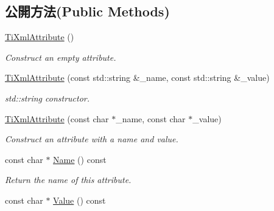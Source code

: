 \subsection*{公開方法(Public Methods)}
\begin{DoxyCompactItemize}
\item 
\hyperlink{class_ti_xml_attribute_a9cfa3c8179873fd485d83003b114f8e1}{Ti\+Xml\+Attribute} ()\hypertarget{class_ti_xml_attribute_a9cfa3c8179873fd485d83003b114f8e1}{}\label{class_ti_xml_attribute_a9cfa3c8179873fd485d83003b114f8e1}

\begin{DoxyCompactList}\small\item\em Construct an empty attribute. \end{DoxyCompactList}\item 
\hyperlink{class_ti_xml_attribute_a052213522caac3979960e0714063861d}{Ti\+Xml\+Attribute} (const std\+::string \&\+\_\+name, const std\+::string \&\+\_\+value)\hypertarget{class_ti_xml_attribute_a052213522caac3979960e0714063861d}{}\label{class_ti_xml_attribute_a052213522caac3979960e0714063861d}

\begin{DoxyCompactList}\small\item\em std\+::string constructor. \end{DoxyCompactList}\item 
\hyperlink{class_ti_xml_attribute_a759d0b76fb8fcf765ecab243bc14f05e}{Ti\+Xml\+Attribute} (const char $\ast$\+\_\+name, const char $\ast$\+\_\+value)\hypertarget{class_ti_xml_attribute_a759d0b76fb8fcf765ecab243bc14f05e}{}\label{class_ti_xml_attribute_a759d0b76fb8fcf765ecab243bc14f05e}

\begin{DoxyCompactList}\small\item\em Construct an attribute with a name and value. \end{DoxyCompactList}\item 
const char $\ast$ \hyperlink{class_ti_xml_attribute_a298a57287d305904ba6bd96ae6f78d3d}{Name} () const \hypertarget{class_ti_xml_attribute_a298a57287d305904ba6bd96ae6f78d3d}{}\label{class_ti_xml_attribute_a298a57287d305904ba6bd96ae6f78d3d}

\begin{DoxyCompactList}\small\item\em Return the name of this attribute. \end{DoxyCompactList}\item 
const char $\ast$ \hyperlink{class_ti_xml_attribute_a0f874490eac8ca00ee0070765d0e97e3}{Value} () const \hypertarget{class_ti_xml_attribute_a0f874490eac8ca00ee0070765d0e97e3}{}\label{class_ti_xml_attribute_a0f874490eac8ca00ee0070765d0e97e3}


\end{DoxyCompactItemize}
